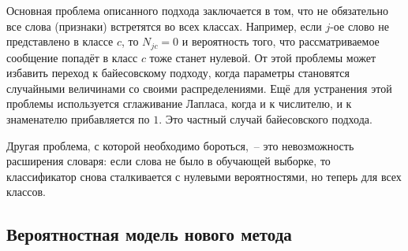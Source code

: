 Основная проблема описанного подхода заключается в том, что не обязательно все слова (признаки)
встретятся во всех классах. Например, если $j$-ое слово не представлено в классе $c$, то $N_{jc}=0$
и вероятность того, что рассматриваемое сообщение попадёт в класс $c$ тоже станет нулевой. От этой
проблемы может избавить переход к байесовскому подходу, когда параметры становятся случайными
величинами со своими распределениями. Ещё для устранения этой проблемы
используется сглаживание Лапласа\cite{field1988laplacian}, когда и к
числителю, и к знаменателю прибавляется по $1$.
Это частный случай байесовского подхода.

Другая проблема, с которой необходимо бороться,~-- это невозможность расширения словаря: если слова
не было в обучающей выборке, то классификатор снова сталкивается с нулевыми вероятностями, но теперь
для всех классов.

\subsection{Вероятностная модель нового метода}
